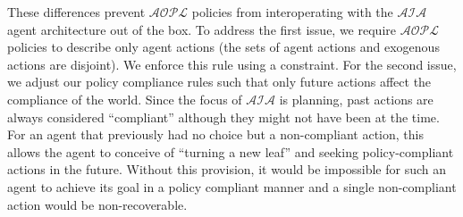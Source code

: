 These differences prevent $\mathcal{AOPL}$ policies from interoperating with the $\mathcal{AIA}$ agent architecture out of the box.
To address the first issue, we require $\mathcal{AOPL}$ policies to describe only agent actions (the sets of agent actions and exogenous actions are disjoint).
We enforce this rule using a constraint.
For the second issue, we adjust our policy compliance rules such that only future actions affect the compliance of the world.
Since the focus of $\mathcal{AIA}$ is planning, past actions are always considered ``compliant'' although they might not have been at the time.
For an agent that previously had no choice but a non-compliant action, this allows the agent to conceive of ``turning a new leaf'' and seeking policy-compliant actions in the future.
Without this provision, it would be impossible for such an agent to achieve its goal in a policy compliant manner and a single non-compliant action would be non-recoverable.

